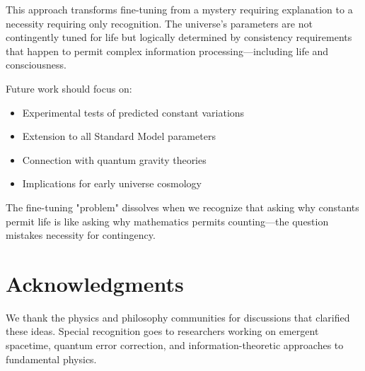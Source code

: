 \documentclass[12pt,a4paper]{article}
\begin{document}
This approach transforms fine-tuning from a mystery requiring explanation to a necessity requiring only recognition. The universe's parameters are not contingently tuned for life but logically determined by consistency requirements that happen to permit complex information processing—including life and consciousness.

Future work should focus on:
\begin{itemize}
\item Experimental tests of predicted constant variations
\item Extension to all Standard Model parameters
\item Connection with quantum gravity theories
\item Implications for early universe cosmology
\end{itemize}

The fine-tuning "problem" dissolves when we recognize that asking why constants permit life is like asking why mathematics permits counting—the question mistakes necessity for contingency.

\section*{Acknowledgments}

We thank the physics and philosophy communities for discussions that clarified these ideas. Special recognition goes to researchers working on emergent spacetime, quantum error correction, and information-theoretic approaches to fundamental physics.
\end{document}

